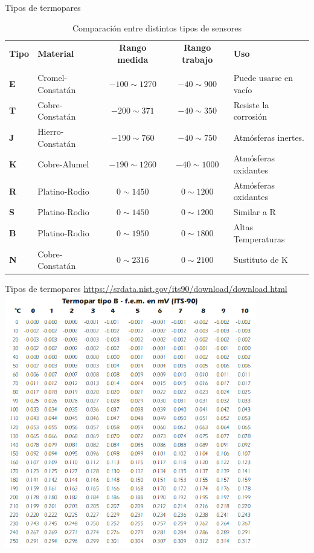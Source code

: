 \documentclass[aspectratio=169]{beamer}
\begin{document}
\begin{frame}{Tipos de termopares}
  \begin{table}[]
    \centering
    \footnotesize{
    \begin{tabular}{m{0.6cm} m{3.4cm} c c m{3.8cm}}
        \toprule
        \textbf{Tipo} & \textbf{Material} &\textbf{Rango medida} & \textbf{Rango trabajo} & \textbf{Uso} \\
        &  &  \centering[\si{\celsius}] & \centering[\si{\celsius}] & \\
        \midrule
        \textbf{E} & Cromel-Constatán & $-100\sim 1270$ & $-40\sim 900$ & Puede usarse en vacío\\
        \textbf{T} & Cobre-Constatán & $-200\sim  371$ & $-40\sim 350$ & Resiste la corrosión\\
        \textbf{J} & Hierro-Constatán & $-190\sim  760$ & $-40\sim 750$ & Atmósferas inertes.\\
        \textbf{K} & Cobre-Alumel & $-190\sim  1260$ & $-40\sim 1000$ & Atmósferas oxidantes\\
        \textbf{R} & Platino-Rodio & $0\sim  1450$ & $0\sim 1200$ & Atmósferas oxidantes\\
        \textbf{S} & Platino-Rodio & $0\sim  1450$ & $0\sim 1200$ & Similar a R\\
        \textbf{B} & Platino-Rodio & $0\sim  1950$ & $0\sim 1800$ & Altas Temperaturas\\
        \textbf{N} & Cobre-Constatán & $0\sim  2316$ & $0\sim 2100$ & Sustituto de K\\
        \bottomrule
    \end{tabular}
    }
    \caption{Comparación entre distintos tipos de sensores\cite{sole2005instrumentacion}}
    \label{tab:Comparacion_termo}
\end{table}
\end{frame}

\begin{frame}{Tipos de termopares \tiny{\href{https://srdata.nist.gov/its90/download/download.html}{https://srdata.nist.gov/its90/download/download.html}}}
\centering
    \includegraphics[width=11cm]{fig/ITS-90.PNG}
\end{frame}
\end{document}
